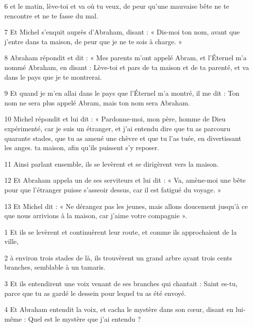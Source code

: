 \par 6 et le matin, lève-toi et va où tu veux, de peur qu'une mauvaise bête ne te rencontre et ne te fasse du mal.

\par 7 Et Michel s'enquit auprès d'Abraham, disant : « Dis-moi ton nom, avant que j'entre dans ta maison, de peur que je ne te sois à charge. »

\par 8 Abraham répondit et dit : « Mes parents m'ont appelé Abram, et l'Éternel m'a nommé Abraham, en disant : Lève-toi et pars de ta maison et de ta parenté, et va dans le pays que je te montrerai.

\par 9 Et quand je m'en allai dans le pays que l'Éternel m'a montré, il me dit : Ton nom ne sera plus appelé Abram, mais ton nom sera Abraham.

\par 10 Michel répondit et lui dit : « Pardonne-moi, mon père, homme de Dieu expérimenté, car je suis un étranger, et j'ai entendu dire que tu as parcouru quarante stades, que tu as amené une chèvre et que tu l'as tuée, en divertissant les anges. ta maison, afin qu'ils puissent s'y reposer.

\par 11 Ainsi parlant ensemble, ils se levèrent et se dirigèrent vers la maison.

\par 12 Et Abraham appela un de ses serviteurs et lui dit : « Va, amène-moi une bête pour que l'étranger puisse s'asseoir dessus, car il est fatigué du voyage. »

\par 13 Et Michel dit : « Ne dérangez pas les jeunes, mais allons doucement jusqu'à ce que nous arrivions à la maison, car j'aime votre compagnie ».


\par 1 Et ils se levèrent et continuèrent leur route, et comme ils approchaient de la ville,

\par 2 à environ trois stades de là, ils trouvèrent un grand arbre ayant trois cents branches, semblable à un tamaris.

\par 3 Et ils entendirent une voix venant de ses branches qui chantait : Saint es-tu, parce que tu as gardé le dessein pour lequel tu as été envoyé.

\par 4 Et Abraham entendit la voix, et cacha le mystère dans son cœur, disant en lui-même : Quel est le mystère que j'ai entendu ?

